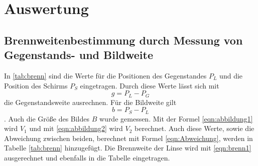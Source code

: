 \section{Auswertung}
\label{sec:Auswertung}



\subsection{Brennweitenbestimmung durch Messung von Gegenstands- und Bildweite}

In \ref{tab:brenn} sind die Werte für die Positionen des Gegenstandes $P_L$ und die Position des Schirms $P_S$ eingetragen.
Durch diese Werte lässt sich mit
\begin{equation}
  g=P_L-P_G
\end{equation}
die Gegenstandsweite ausrechnen.
Für die Bildweite gilt
\begin{equation}
  b=P_S-P_L
\end{equation}.
Auch die Größe des Bildes $B$ wurde gemessen.
Mit der Formel \ref{eqn:abbildung1} wird $V_1$ und mit \ref{eqn:abbildung2} wird $V_2$ berechnet.
Auch diese Werte, sowie die Abweichung zwischen beiden, berechnet mit Formel \ref{eqn:Abweichung}, werden in Tabelle \ref{tab:brenn} hinzugefügt.
Die Brennweite der Linse wird mit \ref{eqn:brenn1} ausgerechnet und ebenfalls in die Tabelle eingetragen.

